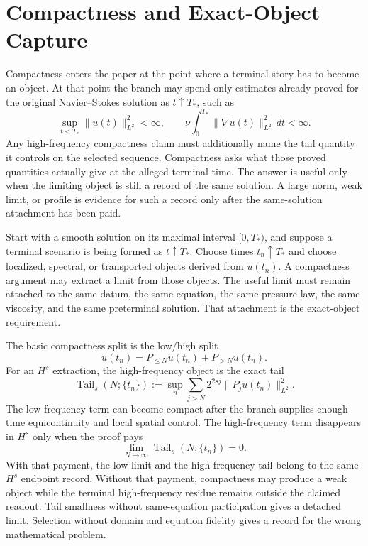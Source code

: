 \section{Compactness and Exact-Object Capture}
\label{sec:compactness-exact-object-branch}

Compactness enters the paper at the point where a terminal story has to become
an object.
At that point the branch may spend only estimates already proved for the
original Navier--Stokes solution as \(t\uparrow T_*\), such as
\[
  \sup_{t<T_*}\|u(t)\|_{L^2}^2<\infty,
  \qquad
  \nu\int_0^{T_*}\|\nabla u(t)\|_{L^2}^2\,dt<\infty.
\]
Any high-frequency compactness claim must additionally name the tail quantity it
controls on the selected sequence.
Compactness asks what those proved quantities actually give at the alleged
terminal time.
The answer is useful only when the limiting object is still a record of the
same solution.
A large norm, weak limit, or profile is evidence for such a record only after
the same-solution attachment has been paid.

Start with a smooth solution on its maximal interval \([0,T_*)\), and suppose a
terminal scenario is being formed as \(t\uparrow T_*\).
Choose times \(t_n\uparrow T_*\) and choose localized, spectral, or transported
objects derived from \(u(t_n)\).
A compactness argument may extract a limit from those objects.
The useful limit must remain attached to the same datum, the same equation, the
same pressure law, the same viscosity, and the same preterminal solution.
That attachment is the exact-object requirement.

The basic compactness split is the low/high split
\[
  u(t_n)=P_{\leq N}u(t_n)+P_{>N}u(t_n).
\]
For an \(H^s\) extraction, the high-frequency object is the exact tail
\[
  \operatorname{Tail}_s(N;\{t_n\})
  :=
  \sup_n
  \sum_{j>N}2^{2sj}\|P_j u(t_n)\|_{L^2}^2.
\]
The low-frequency term can become compact after the branch supplies enough time
equicontinuity and local spatial control.
The high-frequency term disappears in \(H^s\) only when the proof pays
\[
  \lim_{N\to\infty}\operatorname{Tail}_s(N;\{t_n\})=0.
\]
With that payment, the low limit and the high-frequency tail belong to the same
\(H^s\) endpoint record.
Without that payment, compactness may produce a weak object while the terminal
high-frequency residue remains outside the claimed readout.
Tail smallness without same-equation participation gives a detached limit.
Selection without domain and equation fidelity gives a record for the wrong
mathematical problem.

